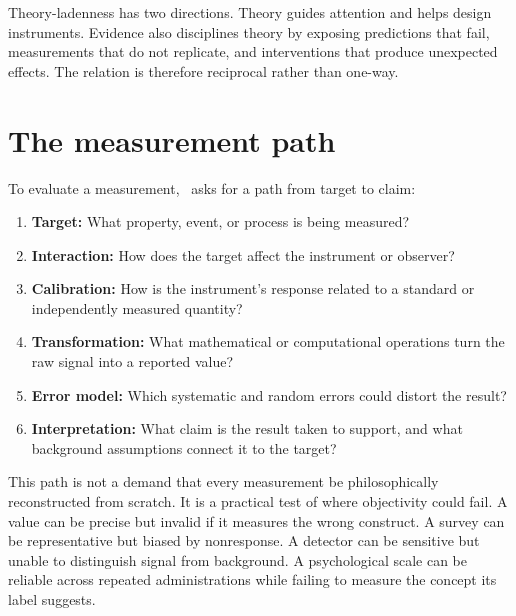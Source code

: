 Theory-ladenness has two directions. Theory guides attention and helps design
instruments. Evidence also disciplines theory by exposing predictions that
fail, measurements that do not replicate, and interventions that produce
unexpected effects. The relation is therefore reciprocal rather than one-way.

\section{The measurement path}

To evaluate a measurement, \RCR\ asks for a path from target to claim:

\begin{enumerate}
\item \textbf{Target:} What property, event, or process is being measured?
\item \textbf{Interaction:} How does the target affect the instrument or
observer?
\item \textbf{Calibration:} How is the instrument's response related to a
standard or independently measured quantity?
\item \textbf{Transformation:} What mathematical or computational operations
turn the raw signal into a reported value?
\item \textbf{Error model:} Which systematic and random errors could distort
the result?
\item \textbf{Interpretation:} What claim is the result taken to support, and
what background assumptions connect it to the target?
\end{enumerate}

This path is not a demand that every measurement be philosophically
reconstructed from scratch. It is a practical test of where objectivity could
fail. A value can be precise but invalid if it measures the wrong construct. A
survey can be representative but biased by nonresponse. A detector can be
sensitive but unable to distinguish signal from background. A psychological
scale can be reliable across repeated administrations while failing to measure
the concept its label suggests.

